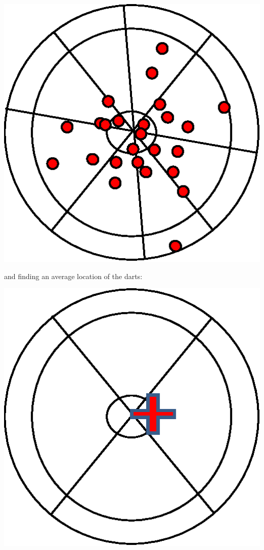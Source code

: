 \documentclass{book}%
\begin{document}
\begin{center}
\includegraphics[scale=0.5]{Lab2_figs/bullseye_many.eps}
\end{center}

and finding an average location of the darts:

\begin{center}
\includegraphics[scale=0.5]{Lab2_figs/bullseye_avg.eps}
\end{center}
\end{document}
